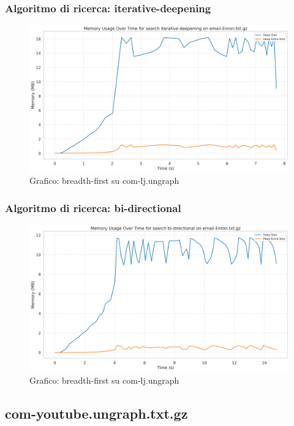 \documentclass{article}
\begin{document}
\subsubsection{Algoritmo di ricerca: iterative-deepening}
\begin{figure}[htbp]\centering
\includegraphics[width=\textwidth]{../plots/email-Enron_iterative-deepening.png}
\caption{Grafico: breadth-first su com-lj.ungraph}
\end{figure}
\subsubsection{Algoritmo di ricerca: bi-directional}
\begin{figure}[htbp]\centering
\includegraphics[width=\textwidth]{../plots/email-Enron_bi-directional.png}
\caption{Grafico: breadth-first su com-lj.ungraph}
\end{figure}
\subsection{com-youtube.ungraph.txt.gz}
\end{document}
